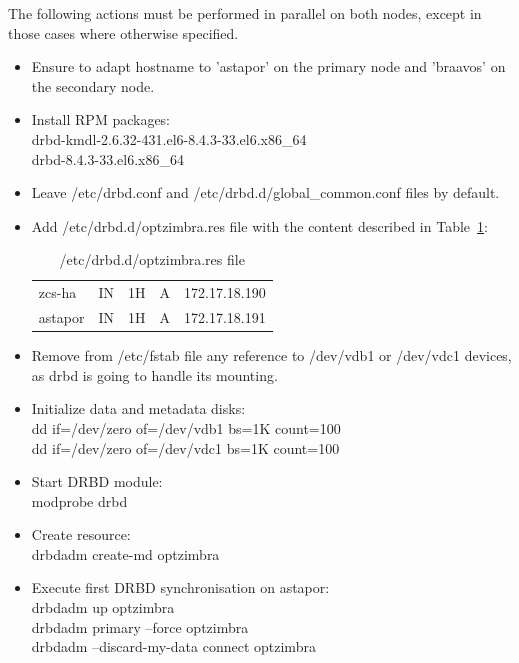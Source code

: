 \documentclass[a4paper, 12pt]{book}
\begin{document}
The following actions must be performed in parallel on both nodes, except in those cases where otherwise specified.

\begin{itemize}
	\item Ensure to adapt hostname to 'astapor' on the primary node and 'braavos' on the secondary node.
	
	\item Install RPM packages:\\
			drbd-kmdl-2.6.32-431.el6-8.4.3-33.el6.x86\_64\\
			drbd-8.4.3-33.el6.x86\_64
	
	\item Leave /etc/drbd.conf and /etc/drbd.d/global\_common.conf files by default.
	
	\item Add /etc/drbd.d/optzimbra.res file with the content described in Table~\ref{table:resource}:
\FloatBarrier
\begin{table}[H]
  \centering
  \begin{tabular}{ | l l l l l | }
    \hline
      zcs-ha          & IN & 1H & A     & 172.17.18.190\\
      astapor         & IN & 1H & A     & 172.17.18.191\\
    \hline
  \end{tabular}
\caption{/etc/drbd.d/optzimbra.res file}
\label{table:resource}
\end{table}
	
	\item Remove from /etc/fstab file any reference to /dev/vdb1 or /dev/vdc1 devices, as drbd is going to handle its mounting.
	
	\item Initialize data and metadata disks:\\
		\indent dd if=/dev/zero of=/dev/vdb1 bs=1K count=100\\
		\indent dd if=/dev/zero of=/dev/vdc1 bs=1K count=100
	
	\item Start DRBD module:\\
		modprobe drbd
	
	\item Create resource:\\
		drbdadm create-md optzimbra
	
	\item Execute first DRBD synchronisation on astapor:\\
		drbdadm up optzimbra\\
		drbdadm primary --force optzimbra\\
		drbdadm --discard-my-data connect optzimbra


\end{itemize}
\end{document}
